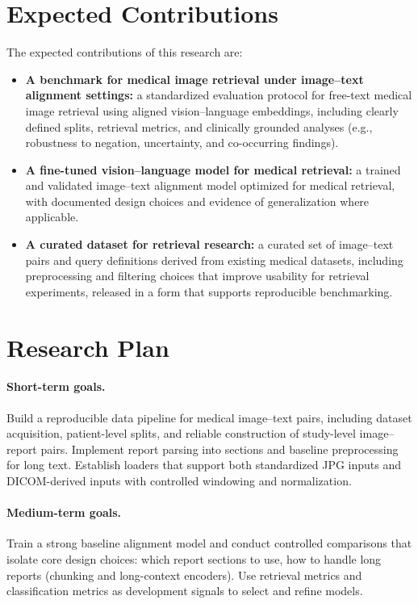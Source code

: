 \documentclass[11pt,a4paper]{article}
\begin{document}
\section{Expected Contributions}
The expected contributions of this research are:
\begin{itemize}
    \item \textbf{A benchmark for medical image retrieval under image--text alignment settings:}
    a standardized evaluation protocol for free-text medical image retrieval using aligned vision--language embeddings, including clearly defined splits, retrieval metrics, and clinically grounded analyses (e.g., robustness to negation, uncertainty, and co-occurring findings).

    \item \textbf{A fine-tuned vision--language model for medical retrieval:}
    a trained and validated image--text alignment model optimized for medical retrieval, with documented design choices and evidence of generalization where applicable.

    \item \textbf{A curated dataset for retrieval research:}
    a curated set of image--text pairs and query definitions derived from existing medical datasets, including preprocessing and filtering choices that improve usability for retrieval experiments,  released in a form that supports reproducible benchmarking.
\end{itemize}

\section{Research Plan}

\paragraph{Short-term goals.}
Build a reproducible data pipeline for medical image--text pairs, including dataset acquisition, patient-level splits, and reliable construction of study-level image--report pairs. Implement report parsing into sections and baseline preprocessing for long text. Establish loaders that support both standardized JPG inputs and DICOM-derived inputs with controlled windowing and normalization.

\paragraph{Medium-term goals.}
Train a strong baseline alignment model and conduct controlled comparisons that isolate core design choices: which report sections to use, how to handle long reports (chunking and long-context encoders). Use retrieval metrics and classification metrics as development signals to select and refine models.
\end{document}
